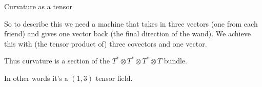 \documentclass{beamer}
\begin{document}
\begin{frame}{Curvature as a tensor}

So to describe this we need a machine that takes in three vectors (one from each friend) and gives one vector back (the final direction of the wand). We achieve this with (the tensor product of) three covectors and one vector.

Thus curvature is a section of the $T^* \otimes T^* \otimes T^* \otimes T$ bundle.

 In other words it's a $(1,3)$ tensor field.

\end{frame}
\end{document}
